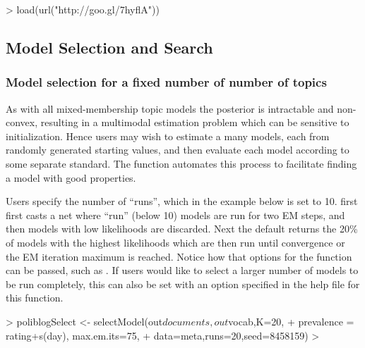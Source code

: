 \documentclass[nojss]{jss}
\begin{document}
\begin{Schunk}
\begin{Sinput}
>  load(url("http://goo.gl/7hyflA"))
\end{Sinput}
\end{Schunk}

\subsection{Model Selection and Search}

\subsubsection{Model selection for a fixed number of number of topics}
As with all mixed-membership topic models the posterior is intractable and non-convex, resulting in a multimodal estimation problem which can be sensitive to initialization. Hence users may wish to estimate a many models, each from randomly generated starting values, and then evaluate each model according to some separate standard. The function  automates this process to facilitate finding a model with good properties.

Users specify the number of ``runs'', which in the example below is set to 10.  first first casts a net where ``run'' (below 10) models are run for two EM steps, and then models with low likelihoods are discarded. Next the default returns the 20\% of models with the highest likelihoods which are then run until convergence or the EM iteration maximum is reached. Notice how that options for the  function can be passed, such as . If users would like to select a larger number of models to be run completely, this can also be set with an option specified in the help file for this function.

\begin{Schunk}
\begin{Sinput}
> poliblogSelect <- selectModel(out$documents,out$vocab,K=20,
+         prevalence =~ rating+s(day), max.em.its=75,
+         data=meta,runs=20,seed=8458159)
> 
\end{Sinput}
\end{Schunk}
\end{document}
